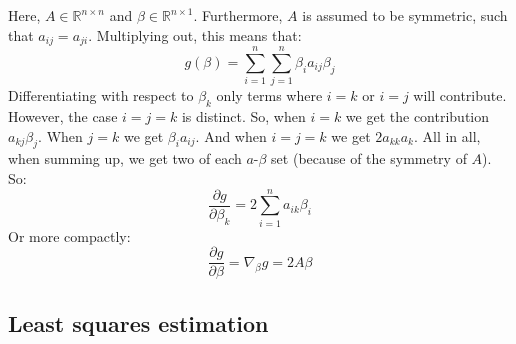 \documentclass[12pt, a4paper]{article}
\begin{document}
Here, $A\in\mathbb{R}^{n\times n}$ and $\beta\in\mathbb{R}^{n\times 1}$. Furthermore, $A$ is assumed to be symmetric, such that $a_{ij}=a_{ji}$. Multiplying out, this means that:
\begin{equation}
g(\beta)=\sum_{i=1}^n\sum_{j=1}^n\beta_i a_{ij}\beta_j
\end{equation}
Differentiating with respect to $\beta_k$ only terms where $i=k$ or $i=j$ will contribute. However, the case $i=j=k$ is distinct. So, when $i=k$ we get the contribution $a_{kj}\beta_j$. When $j=k$ we get $\beta_i a_{ij}$. And when $i=j=k$ we get $2a_{kk}a_k$. All in all, when summing up, we get two of each $a$-$\beta$ set (because of the symmetry of $A$). So:
\begin{equation}
\frac{\partial g}{\partial\beta_k}=2\sum_{i=1}^n a_{ik}\beta_i
\end{equation}
Or more compactly:
\begin{equation}
\label{quadformdif}
\frac{\partial g}{\partial \beta}=\nabla_\beta g=2A\beta
\end{equation}

\subsection{Least squares estimation}
\end{document}
